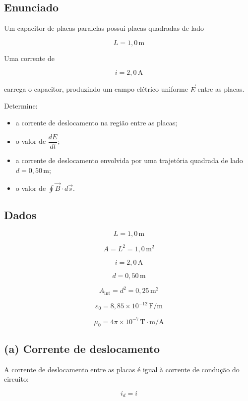 \documentclass[12pt,a4paper]{article}
\begin{document}
\subsection*{Enunciado}

Um capacitor de placas paralelas possui placas quadradas de lado

\[
L = 1,0\,\text{m}
\]

Uma corrente de

\[
i = 2,0\,\text{A}
\]

carrega o capacitor, produzindo um campo elétrico uniforme
$\vec{E}$ entre as placas.

Determine:

\begin{itemize}
    \item[(a)] a corrente de deslocamento na região entre as placas;
    \item[(b)] o valor de $\dfrac{dE}{dt}$;
    \item[(c)] a corrente de deslocamento envolvida por uma trajetória quadrada de lado
    $d = 0,50\,\text{m}$;
    \item[(d)] o valor de
    $\displaystyle \oint \vec{B}\cdot d\vec{s}$.
\end{itemize}

\subsection*{Dados}

\[
L = 1,0\,\text{m}
\]

\[
A = L^2 = 1,0\,\text{m}^2
\]

\[
i = 2,0\,\text{A}
\]

\[
d = 0,50\,\text{m}
\]

\[
A_{\text{int}} = d^2 = 0,25\,\text{m}^2
\]

\[
\varepsilon_0 = 8,85\times10^{-12}\,\text{F/m}
\]

\[
\mu_0 = 4\pi\times10^{-7}\,\text{T}\cdot\text{m/A}
\]


\subsection*{(a) Corrente de deslocamento}

A corrente de deslocamento entre as placas é igual à corrente de
condução do circuito:

\[
i_d = i
\]
\end{document}
